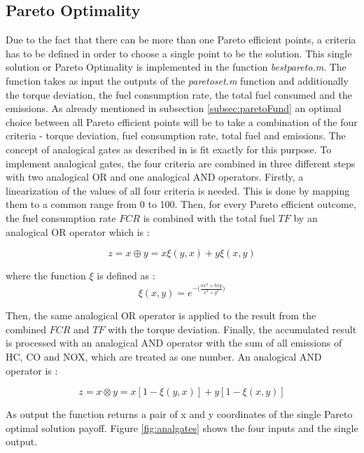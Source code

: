 \subsection{Pareto Optimality}
\label{subsec:paretoImpl}
Due to the fact that there can be more than one Pareto efficient points, a criteria has to be defined in order to choose a single point to be the solution. This single solution or Pareto Optimality is implemented in the function \textit{bestpareto.m}. The function takes as input the outputs of the \textit{paretoset.m} function and additionally the torque deviation, the fuel consumption rate, the total fuel consumed and the emissions. As already mentioned in subsection \ref{subsec:paretoFund} an optimal choice between all Pareto efficient points will be to take a combination of the four criteria - torque deviation, fuel consumption rate, total fuel and emissions. The concept of analogical gates as described in \citet{badreddin1995analogical} is fit exactly for this purpose. To implement analogical gates, the four criteria are combined in three different steps with two analogical OR and one analogical AND operators. Firstly, a linearization of the values of all four criteria is needed. This is done by mapping them to a common range from 0 to 100. Then, for every Pareto efficient outcome, the fuel consumption rate $FCR$ is combined with the total fuel $TF$ by an analogical OR operator which is \citep{badreddin1995analogical}:

\begin{equation}
z = x \oplus y = x \xi(y,x) + y \xi(x,y)
\end{equation}

where the function $\xi$ is defined as \citet{badreddin1995analogical}:
\begin{equation}
\xi(x,y) =  e^{-\Big(\frac{ax^2+bxy}{x^2+y^2}\Big)}
\end{equation}

Then, the same analogical OR operator is applied to the result from the combined $FCR$ and $TF$ with the torque deviation. Finally, the accumulated result is processed with an analogical AND operator with the sum of all emissions of HC, CO and NOX, which are treated as one number. An analogical AND operator is \citet{badreddin1995analogical}:

\begin{equation}
z = x \otimes y = x[1 - \xi(y,x)] + y[1 - \xi(x,y)]
\end{equation}

As output the function returns a pair of x and y coordinates of the single Pareto optimal solution payoff. Figure \ref{fig:analgates} shows the four inputs and the single output.

